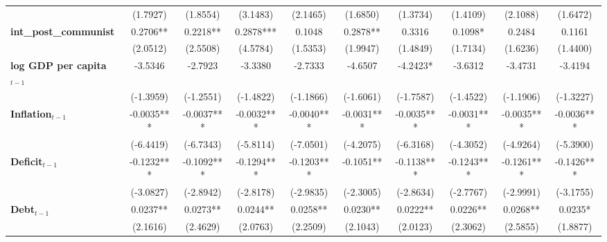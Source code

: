 \begin{center}
\begin{tabular}{lccccccccc}
\textbf{ }                         &    (1.7927)    &     (1.8554)     &     (3.1483)     &     (2.1465)     &     (1.6850)     &     (1.3734)     &     (1.4109)     &     (2.1088)     &     (1.6472)      \\
\textbf{int\_post\_communist}      &    0.2706**    &     0.2218**     &    0.2878***     &      0.1048      &     0.2878**     &      0.3316      &     0.1098*      &      0.2484      &      0.1161       \\
\textbf{ }                         &    (2.0512)    &     (2.5508)     &     (4.5784)     &     (1.5353)     &     (1.9947)     &     (1.4849)     &     (1.7134)     &     (1.6236)     &     (1.4400)      \\
\textbf{log GDP per capita$_{t-1}$}           &    -3.5346     &     -2.7923      &     -3.3380      &     -2.7333      &     -4.6507      &     -4.2423*     &     -3.6312      &     -3.4731      &     -3.4194       \\
\textbf{ }                         &   (-1.3959)    &    (-1.2551)     &    (-1.4822)     &    (-1.1866)     &    (-1.6061)     &    (-1.7587)     &    (-1.4522)     &    (-1.1906)     &    (-1.3227)      \\
\textbf{Inflation$_{t-1}$}      &   -0.0035***   &    -0.0037***    &    -0.0032***    &    -0.0040***    &    -0.0031***    &    -0.0035***    &    -0.0031***    &    -0.0035***    &    -0.0036***     \\
\textbf{ }                         &   (-6.4419)    &    (-6.7343)     &    (-5.8114)     &    (-7.0501)     &    (-4.2075)     &    (-6.3168)     &    (-4.3052)     &    (-4.9264)     &    (-5.3900)      \\
\textbf{Deficit$_{t-1}$}             &   -0.1232***   &    -0.1092***    &    -0.1294***    &    -0.1203***    &    -0.1051**     &    -0.1138***    &    -0.1243***    &    -0.1261***    &    -0.1426***     \\
\textbf{ }                         &   (-3.0827)    &    (-2.8942)     &    (-2.8178)     &    (-2.9835)     &    (-2.3005)     &    (-2.8634)     &    (-2.7767)     &    (-2.9991)     &    (-3.1755)      \\
\textbf{Debt$_{t-1}$}                &    0.0237**    &     0.0273**     &     0.0244**     &     0.0258**     &     0.0230**     &     0.0222**     &     0.0226**     &     0.0268**     &     0.0235*       \\
\textbf{ }                         &    (2.1616)    &     (2.4629)     &     (2.0763)     &     (2.2509)     &     (2.1043)     &     (2.0123)     &     (2.3062)     &     (2.5855)     &     (1.8877)      \\

\end{tabular}
\end{center}
